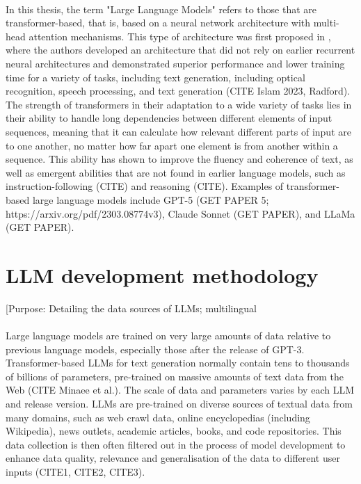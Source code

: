 \documentclass[thesis]{cluu}
\begin{document}
\paragraph{}
In this thesis, the term "Large Language Models" refers to those that are transformer-based, that is, based on a neural network architecture with multi-head attention mechanisms. This type of architecture was first proposed in \textcite{vaswani2017attention}, where the authors developed an architecture that did not rely on earlier recurrent neural architectures and demonstrated superior performance and lower training time for a variety of tasks, including text generation, including optical recognition, speech processing, and text generation  (CITE Islam 2023, Radford). The strength of
transformers in their adaptation to a wide variety of tasks lies in their ability to handle long dependencies between different elements of input sequences, meaning that it can calculate how relevant different parts of input are to one
another, no matter how far apart one element is from another
within a sequence. This ability has shown to improve the fluency and coherence of text, as well as emergent abilities that are not found in earlier language models, such as instruction-following (CITE) and reasoning (CITE). Examples of transformer-based large language models include GPT-5 (GET PAPER 5; https://arxiv.org/pdf/2303.08774v3), Claude Sonnet (GET PAPER), and LLaMa (GET PAPER). 

\section{LLM development methodology}
[Purpose: Detailing the data sources of LLMs; multilingual 
\paragraph{}
Large language models are trained on very large amounts of data relative to previous language models, especially those after the release of GPT-3. Transformer-based LLMs for text generation normally contain tens to thousands of billions of parameters, pre-trained on massive amounts of text data from the Web (CITE Minaee et al.). The scale of data and parameters varies by each LLM and release version.  LLMs are pre-trained on diverse sources of textual data from many domains, such as web crawl data, online encyclopedias (including Wikipedia), news outlets, academic articles, books, and code repositories. This data collection is then often filtered out in the process of model development to enhance data quality, relevance and generalisation of the data to different user inputs (CITE1, CITE2, CITE3).  \parencite{Brown2020LanguageMA}
\end{document}
